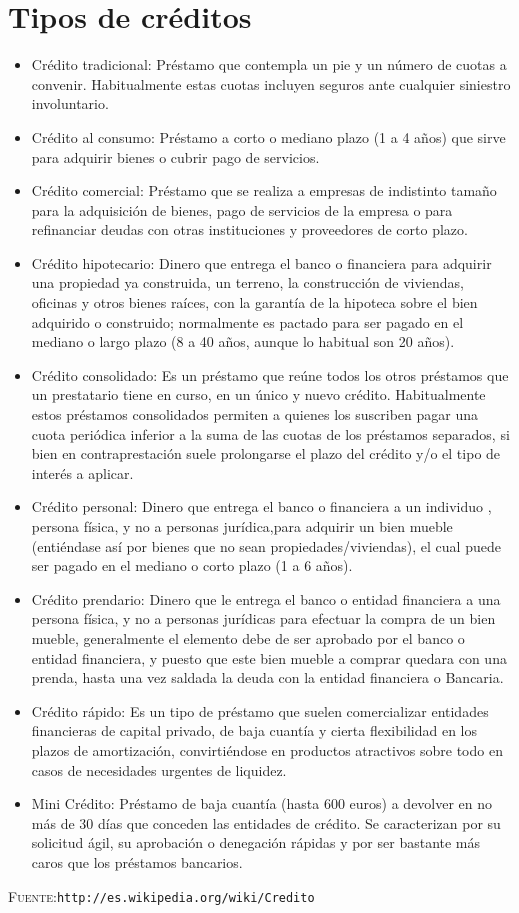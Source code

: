 \documentclass[letterpaper,11pt]{article}
\begin{document}
\section{Tipos de créditos}
\begin{itemize}
	\item Crédito tradicional: Préstamo que contempla un pie y un número de cuotas a convenir. Habitualmente estas cuotas incluyen seguros ante cualquier siniestro involuntario.
	\item Crédito al consumo: Préstamo a corto o mediano plazo (1 a 4 años) que sirve para adquirir bienes o cubrir pago de servicios.
	\item Crédito comercial: Préstamo que se realiza a empresas de indistinto tamaño para la adquisición de bienes, pago de servicios de la empresa o para refinanciar deudas con otras instituciones y proveedores de corto plazo.
	\item Crédito hipotecario: Dinero que entrega el banco o financiera para adquirir una propiedad ya construida, un terreno, la construcción de viviendas, oficinas y otros bienes raíces, con la garantía de la hipoteca sobre el bien adquirido o construido; normalmente es pactado para ser pagado en el mediano o largo plazo (8 a 40 años, aunque lo habitual son 20 años).
	\item Crédito consolidado: Es un préstamo que reúne todos los otros préstamos que un prestatario tiene en curso, en un único y nuevo crédito. Habitualmente estos préstamos consolidados permiten a quienes los suscriben pagar una cuota periódica inferior a la suma de las cuotas de los préstamos separados, si bien en contraprestación suele prolongarse el plazo del crédito y/o el tipo de interés a aplicar.
	\item Crédito personal: Dinero que entrega el banco o financiera a un individuo , persona física, y no a personas jurídica,para adquirir un bien mueble (entiéndase así por bienes que no sean propiedades/viviendas), el cual puede ser pagado en el mediano o corto plazo (1 a 6 años).
	\item Crédito prendario: Dinero que le entrega el banco o entidad financiera a una persona física, y no a personas jurídicas para efectuar la compra de un bien mueble, generalmente el elemento debe de ser aprobado por el banco o entidad financiera, y puesto que este bien mueble a comprar quedara con una prenda, hasta una vez saldada la deuda con la entidad financiera o Bancaria.
	\item Crédito rápido: Es un tipo de préstamo que suelen comercializar entidades financieras de capital privado, de baja cuantía y cierta flexibilidad en los plazos de amortización, convirtiéndose en productos atractivos sobre todo en casos de necesidades urgentes de liquidez.
	\item Mini Crédito: Préstamo de baja cuantía (hasta 600 euros) a devolver en no más de 30 días que conceden las entidades de crédito. Se caracterizan por su solicitud ágil, su aprobación o denegación rápidas y por ser bastante más caros que los préstamos bancarios. 
\end{itemize}

\noindent\textsc{Fuente:}\texttt{http://es.wikipedia.org/wiki/Credito}
\end{document}
